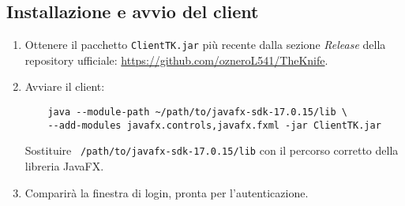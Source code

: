 \subsection{Installazione e avvio del client}
\begin{enumerate}
    \item Ottenere il pacchetto \texttt{ClientTK.jar} più recente 
    dalla sezione \emph{Release} della repository ufficiale: \href{https://github.com/ozneroL541/TheKnife}{https://github.com/ozneroL541/TheKnife}.
    \item Avviare il client:
    \begin{verbatim}
    java --module-path ~/path/to/javafx-sdk-17.0.15/lib \
    --add-modules javafx.controls,javafx.fxml -jar ClientTK.jar
    \end{verbatim}
    Sostituire \texttt{~/path/to/javafx-sdk-17.0.15/lib} con il percorso corretto della libreria JavaFX.
    \item Comparirà la finestra di login, pronta per l'autenticazione.
\end{enumerate}

